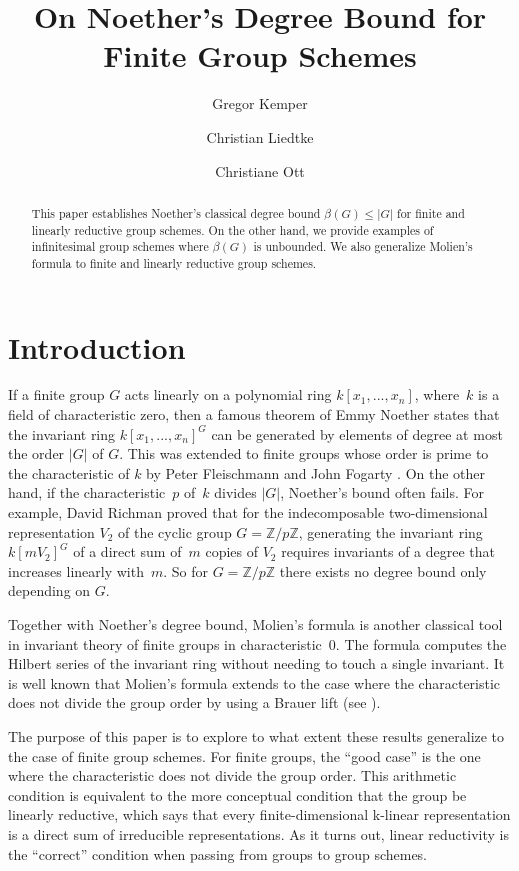 \documentclass[reqno]{amsart}
\title[On Noether's Degree Bound]{On Noether's Degree Bound for Finite Group Schemes}
\author{Gregor Kemper}
\author{Christian Liedtke}
\author{Christiane Ott}
\newcommand{\ZZ}{{\mathbb{Z}}}
\theoremstyle{definition}
\theoremstyle{plain}
\begin{document}
\begin{abstract}
This paper establishes Noether's classical degree bound $\beta(G)\leq|G|$ for finite and linearly reductive
group schemes. On the other hand, we provide examples of infinitesimal group schemes where $\beta(G)$ is unbounded.
We also generalize Molien's formula to finite and linearly reductive
group schemes.
\end{abstract}

\maketitle

\section{Introduction}

If a finite group $G$ acts linearly on a polynomial ring $k[x_1,...,x_n]$, where~$k$ is a field of
characteristic zero, then a famous theorem of Emmy Noether \cite{Noether} states that
the invariant ring $k[x_1,...,x_n]^G$ can be generated by elements of degree at most the
order $|G|$ of $G$.
This was extended to finite groups whose order is prime to the characteristic of $k$
by Peter Fleischmann \cite{Fleischmann} and John Fogarty \cite{Fogarty}. On the other hand, 
if the characteristic~$p$ of~$k$ divides $|G|$, Noether's bound often fails. For example, David Richman 
\cite{Richman90} proved that for the indecomposable two-dimensional representation $V_2$ of the cyclic group $G = \ZZ/p\ZZ$,
generating the invariant ring $k[m V_2]^G$ of a direct sum of~$m$ copies of $V_2$ requires invariants of a degree
that increases linearly with~$m$. So for $G = \ZZ/p\ZZ$ there exists no degree bound only depending on $G$.

Together with Noether's degree bound, Molien's formula is another classical tool in invariant theory of finite groups
in characteristic~$0$. The formula computes the Hilbert series of the invariant ring without needing to touch a single
invariant. It is well known that Molien's formula extends to the case where the characteristic does
not divide the group order by using a Brauer lift (see \cite[Section~3.4.19]{DK}).

The purpose of this paper is to explore to what extent these results generalize to the case of finite group schemes.
For finite groups, the ``good case'' is the one where the characteristic does not divide the group order. This
arithmetic condition is equivalent to the more conceptual condition that the group be linearly reductive, which
says that every finite-dimensional k-linear representation is a direct sum of irreducible representations.
As it turns out, linear reductivity is the ``correct'' condition when passing from groups to group schemes.
\end{document}
